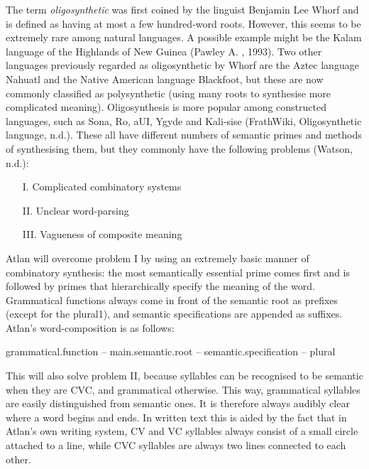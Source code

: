 
The term \textit{oligosynthetic} was first coined by the linguist Benjamin Lee Whorf and is defined as having at most a few hundred-word roots. However, this seems to be extremely rare among natural languages. A possible example might be the Kalam language of the Highlands of New Guinea (Pawley A. , 1993). Two other languages previously regarded as oligosynthetic by Whorf are the Aztec language Nahuatl and the Native American language Blackfoot, but these are now commonly classified as polysynthetic (using many roots to synthesise more complicated meaning). Oligosynthesis is more popular among constructed languages, such as Sona, Ro, aUI, Ygyde and Kali-sise (FrathWiki, Oligosynthetic language, n.d.). These all have different numbers of semantic primes and methods of synthesising them, but they commonly have the following problems (Watson, n.d.): 

\begin{itemize}
\item [I.] Complicated combinatory systems  

\item[II.] Unclear word-parsing  

\item[III.]Vagueness of composite meaning 
\end{itemize}

Atlan will overcome problem I by using an extremely basic manner of combinatory synthesis: the most semantically essential prime comes first and is followed by primes that hierarchically specify the meaning of the word. Grammatical functions always come in front of the semantic root as prefixes (except for the plural1), and semantic specifications are appended as suffixes. Atlan's word-composition is as follows:  

\begin{center}
{grammatical.function –  main.semantic.root – semantic.specification – plural} 
\end{center}
\quad
 

This will also solve problem II, because syllables can be recognised to be semantic when they are CVC, and grammatical otherwise. This way, grammatical syllables are easily distinguished from semantic ones. It is therefore always audibly clear where a word begins and ends. In written text this is aided by the fact that in Atlan’s own writing system, CV and VC syllables always consist of a small circle attached to a line, while CVC syllables are always two lines connected to each other.  

